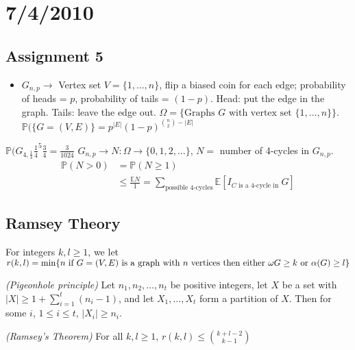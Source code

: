 \documentclass{article}
\begin{document}
\section*{7/4/2010}

\subsection*{Assignment 5}
\begin{itemize}
\item $G_{n,p} \rightarrow$ Vertex set  $V= \{ 1, \dots, n\}$, flip a biased coin for each edge; probability of heads = $p$, probability of tails = $(1-p)$.  Head: put the edge in the graph. Tails: leave the edge out.  $\Omega = \{ \text{Graphs }G\text{ with vertex set }\{1,\dots,n\}\}$.  $\mathbb{P}(\{G=(V,E)\} = p^{|E|}(1-p)^{ {n \choose 2} - |E|} $
\end{itemize}
\begin{examp}
$\mathbb{P}(G_{4, \frac{1}{4}}\frac{1}{4}^{5}\frac{3}{4}=\frac{3}{1024}$
$G_{n,p} \rightarrow N: \Omega \rightarrow \{0,1,2, \ldots \}$, $N=$ number of 4-cycles in $G_{n,p}$.
\begin{align*}
\mathbb{P}(N>0) &= \mathbb{P} (N \ge 1) \\ 
& \le \frac{\mathbb{E} N} {1} = \sum_{\text{possible 4-cycles}} \mathbb{E} [I_{C \text{ is a 4-cycle in }}G]
\end{align*}
\end{examp}

\subsection*{Ramsey Theory}
\begin{defn}
For integers $k, l \ge 1$, we let $r(k,l) =\min\{n \text{ if } G=(V,E) \textmd{ is a graph with $n$ vertices then either } \omega{G} \ge k \text{ or } \alpha(G) \ge l\}$
\end{defn}

\begin{thm}
\emph{(Pigeonhole principle)}  Let $n_1, n_2, \ldots, n_t$ be positive integers, let $X$ be a set with $|X|\ge 1 + \displaystyle \sum_{i=1}^t (n_i -1)$, and let $X_1, \ldots, X_t$ form a partition of $X$.  Then for some $i$, $1 \le i \le t$, $|X_i| \ge n_i$.
\end{thm}

\begin{thm}
\label{ramseythm}
\emph{(Ramsey's Theorem)}  For all $k, l \ge 1$, $r(k,l) \le {k + l -2 \choose k-1}$
\end{thm}
\end{document}
